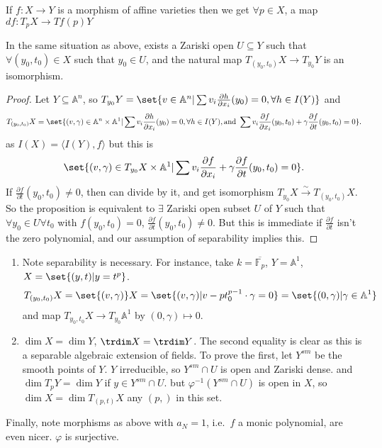 \documentclass{article}
\newcommand{\A}{\mathbb{A}}
\begin{document}
\begin{ex}
    If $f: X \to Y$ is a morphism of affine varieties then we get $\forall p \in X$, a map $df: T_p X \to T f(p) Y$
\end{ex}
\begin{prop}
    In the same situation as above, exists a Zariski open $U \subseteq Y$ such that $\forall (y_0, t_0) \in X$ such that $y_0 \in U$, and the natural map $T_{(y_0, t_0)} X \to T_{y_0} Y$ is an isomorphism.
\end{prop}
\begin{proof}
    Let $Y \subseteq \A^n$, so $T_{y_0} Y = \set{v \in \A^n | \sum v_i \frac{\partial h}{\partial x_i}(y_0) = 0, \forall h \in I(Y)}$ and
    \begin{equation*}
        T_{(y_0, t_0)} X = \set{(v, \gamma) \in \A^n \times \A^1 | \sum v_i \frac{\partial h}{\partial x_i}(y_0) = 0, \forall h \in I(Y), \text{and } \sum v_i \frac{\partial f}{\partial x_i} (y_0, t_0) + \gamma \frac{\partial f}{\partial t}(y_0, t_0) = 0}.
    \end{equation*}
    as $I(X) = \langle I(Y), f \rangle$ but this is
    \begin{equation*}
        \set{(v, \gamma) \in T_{y_0} X \times \A^1 | \sum v_i \frac{\partial f}{\partial x_i} + \gamma \frac{\partial f}{\partial t}(y_0, t_0) = 0}.
    \end{equation*}
    If $\frac{\partial f}{\partial t}(y_0, t_0) \neq 0$, then can divide by it, and get isomorphism $T_{y_0} X \overset{\sim}{\rightarrow} T_{(y_0, t_0)} X$.
    So the proposition is equivalent to $\exists$ Zariski open subset $U$ of $Y$ such that $\forall y_0 \in U \forall t_0$ with $f(y_0, t_0) = 0$, $\frac{\partial f}{\partial t}(y_0, t_0) \neq 0$.
    But this is immediate if $\frac{\partial f}{\partial t}$ isn't the zero polynomial, and our assumption of separability implies this.
\end{proof}

\begin{enumerate}[label=(\arabic*)]
    \item Note separability is necessary. For instance, take $k = \overline{\mathbb{F}_p}$, $Y = \A^1$, $X = \set{(y, t) | y = t^p}$.
        \begin{equation*}
            T_{(y_0, t_0)} X = \set{(v, \gamma)} X = \set{(v, \gamma) | v - p t_0^{p-1} \cdot \gamma = 0} = \set{(0, \gamma) | \gamma \in \A^1}
        \end{equation*}
        and map $T_{y_0, t_0} X \to T_{y_0} \A^1$ by $(0, \gamma) \mapsto 0$.
    \item $\dim X = \dim Y$, $\trdim X = \trdim Y$. The second equality is clear as this is a separable algebraic extension of fields.
        To prove the first, let $Y^{sm}$ be the smooth points of $Y$. $Y$ irreducible, so $Y^{sm} \cap U$ is open and Zariski dense. and $\dim T_p Y = \dim Y$ if $y \in Y^{sm} \cap U$.
        but $\varphi^{-1} (Y^{sm} \cap U)$ is open in $X$, so $\dim X = \dim T_{(p, t)} X$ any $(p, )$ in this set.
\end{enumerate}

Finally, note morphisms as above with $a_N = 1$, i.e.\ $f$ a monic polynomial, are even nicer. $\varphi$ is surjective.
\end{document}

